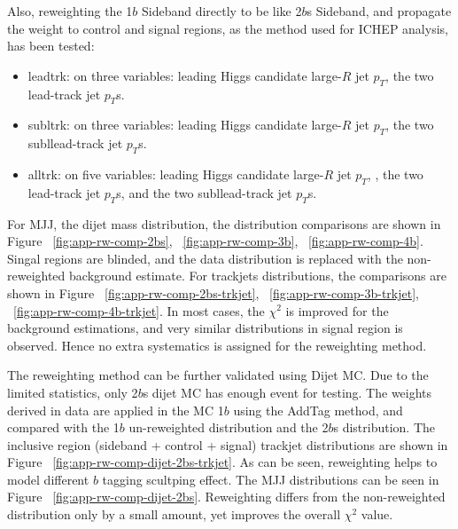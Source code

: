 Also, reweighting the 1$b$ Sideband directly to be like 2$b$s Sideband, and propagate the weight to control and signal regions, as the method used for ICHEP analysis, has been tested:
\begin{itemize}
	\item leadtrk: on three variables: leading Higgs candidate large-$R$ jet $p_{T}$, the two lead-track jet $p_{T}$s.
	\item subltrk: on three variables: leading Higgs candidate large-$R$ jet $p_{T}$, the two subllead-track jet $p_{T}$s.
	\item alltrk: on five variables: leading Higgs candidate large-$R$ jet $p_{T}$, , the two lead-track jet $p_{T}$s, and the two subllead-track jet $p_{T}$s.
\end{itemize}

For MJJ, the dijet mass distribution, the distribution comparisons are shown in Figure ~\ref{fig:app-rw-comp-2bs}, ~\ref{fig:app-rw-comp-3b}, ~\ref{fig:app-rw-comp-4b}. Singal regions are blinded, and the data distribution is replaced with the non-reweighted background estimate. For trackjets \pt distributions, the comparisons are shown in Figure ~\ref{fig:app-rw-comp-2bs-trkjet}, ~\ref{fig:app-rw-comp-3b-trkjet}, ~\ref{fig:app-rw-comp-4b-trkjet}. In most cases, the $\chi^2$ is improved for the background estimations, and very similar distributions in signal region is observed. Hence no extra systematics is assigned for the reweighting method.

The reweighting method can be further validated using Dijet MC. Due to the limited statistics, only 2$b$s dijet MC has enough event for testing. The weights derived in data are applied in the MC 1$b$ using the AddTag method, and compared with the 1$b$ un-reweighted distribution and the 2$b$s distribution. The inclusive region (sideband + control + signal) trackjet \pt distributions are shown in Figure ~\ref{fig:app-rw-comp-dijet-2bs-trkjet}. As can be seen, reweighting helps to model different $b$ tagging scultping effect. The MJJ distributions can be seen in Figure ~\ref{fig:app-rw-comp-dijet-2bs}. Reweighting differs from the non-reweighted distribution only by a small amount, yet improves the overall $\chi^2$ value.

